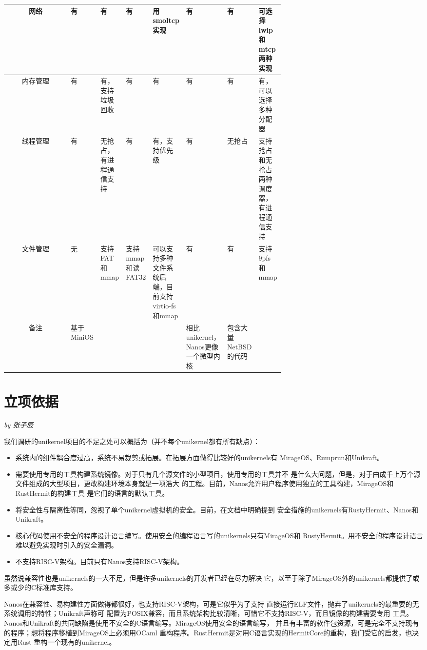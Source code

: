 \documentclass[UTF8,fontset=none,linespread=1.15]{ctexart}
\newcommand{\sectionauthor}[1]{%
\vspace*{-5ex}
\noindent\textrm{\hfill\textit{by #1}}
\vspace*{2ex}\par}
\begin{document}
\begin{longtable}{|c*{7}{|>{\centering\arraybackslash}p{0.095\linewidth}}|}
网络&有&有&有&用smoltcp实现&有&有&可选择lwip和mtcp两种实现\\\hline
内存管理&有&有，支持垃圾回收&有&有&有&有&有，可以选择多种分配器\\\hline
线程管理&有&无抢占，有进程通信支持&有&有，支持优先级&有&无抢占&支持抢占和无抢占两种调度器，有进程通信支持\\\hline
文件管理&无&支持FAT和mmap&支持mmap和读FAT32&可以支持多种文件系统后端，目前支持virtio-fs和mmap&有&有&支持9pfs和mmap\\\hline
备注&基于MiniOS&&&&相比unikernel，Nanos更像一个微型内核&包含大量NetBSD的代码&\\\hline
\end{longtable}
\normalsize


\section{立项依据}\sectionauthor{张子辰}
我们调研的unikernel项目的不足之处可以概括为（并不每个unikernel都有所有缺点）：
\begin{itemize}
\item 系统内的组件耦合度过高，系统不易裁剪或拓展。在拓展方面做得比较好的unikernels有
MirageOS、Rumprun和Unikraft。
\item 需要使用专用的工具构建系统镜像。对于只有几个源文件的小型项目，使用专用的工具并不
是什么大问题，但是，对于由成千上万个源文件组成的大型项目，更改构建环境本身就是一项浩大
的工程。目前，Nanos允许用户程序使用独立的工具构建，MirageOS和RustHermit的构建工具
是它们的语言的默认工具。
\item 将安全性与隔离性等同，忽视了单个unikernel虚拟机的安全。目前，在文档中明确提到
安全措施的unikernels有RustyHermit、Nanos和Unikraft。
\item 核心代码使用不安全的程序设计语言编写。使用安全的编程语言写的unikernels只有MirageOS和
RustyHermit。用不安全的程序设计语言难以避免实现时引入的安全漏洞。
\item 不支持RISC-V架构。目前只有Nanos支持RISC-V架构。
\end{itemize}
虽然说兼容性也是unikernels的一大不足，但是许多unikernels的开发者已经在尽力解决
它，以至于除了MirageOS外的unikernels都提供了或多或少的C标准库支持。

Nanos在兼容性、易构建性方面做得都很好，也支持RISC-V架构，可是它似乎为了支持
直接运行ELF文件，抛弃了unikernels的最重要的无系统调用的特性；Unikraft声称可
配置为POSIX兼容，而且系统架构比较清晰，可惜它不支持RISC-V，而且镜像的构建需要专用
工具。Nanos和Unikraft的共同缺陷是使用不安全的C语言编写。MirageOS使用安全的语言编写，
并且有丰富的软件包资源，可是完全不支持现有的程序；想将程序移植到MirageOS上必须用OCaml
重构程序。RustHermit是对用C语言实现的HermitCore的重构，我们受它的启发，也决定用Rust
重构一个现有的unikernel。
\end{document}
